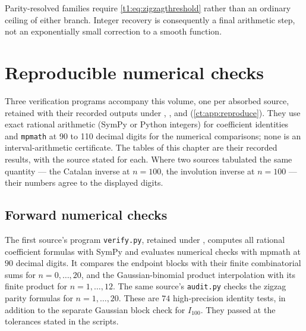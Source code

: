 \documentclass[11pt,openany]{book}
\numberwithin{equation}{chapter}
\theoremstyle{plain}
\theoremstyle{definition}
\theoremstyle{remark}
\begin{document}
Parity-resolved families require \eqref{t1:eq:zigzagthreshold} rather than an ordinary ceiling of either branch. Integer recovery is consequently a final arithmetic step, not an exponentially small correction to a smooth function.

\chapter{Reproducible numerical checks}
\label{ct:ch:numerics}

Three verification programs accompany this volume, one per absorbed source,
retained with their recorded outputs under ,
, and 
(\cref{ct:app:reproduce}).  They use exact rational arithmetic (SymPy or
Python integers) for coefficient identities and \texttt{mpmath} at 90 to 110
decimal digits for the numerical comparisons; none is an interval-arithmetic
certificate.  The tables of this chapter are their recorded results, with
the source stated for each.  Where two sources tabulated the same quantity
--- the Catalan inverse at $n=100$, the involution inverse at $n=100$ ---
their numbers agree to the displayed digits.

\section{Forward numerical checks}
The first source's program \texttt{verify.py}, retained under , computes all rational coefficient formulas with SymPy and evaluates numerical checks with mpmath at $90$ decimal digits. It compares the endpoint blocks with their finite combinatorial sums for $n=0,\ldots,20$, and the Gaussian-binomial product interpolation with its finite product for $n=1,\ldots,12$. The same source's \texttt{audit.py} checks the zigzag parity formulas for $n=1,\ldots,20$. These are $74$ high-precision identity tests, in addition to the separate Gaussian block check for $I_{100}$. They passed at the tolerances stated in the scripts.
\end{document}
